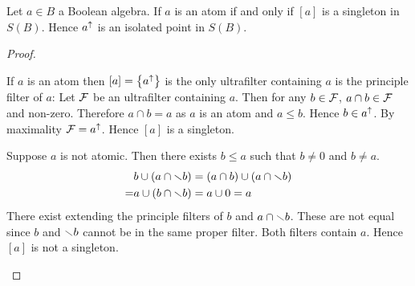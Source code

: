 \begin{prop}
    Let $a \in B$ a Boolean algebra.
    If $a$ is an atom if and only if $[a]$ is a singleton in $S(B)$.
    Hence $a^{\uparrow}$ is an isolated point in $S(B)$.
\end{prop}
\begin{proof}
    \begin{forward}
        If $a$ is an atom then $[a] = \left\{a^{\uparrow}\right\}$ is the only ultrafilter 
        containing $a$ is the principle filter of $a$:
        Let $\mathcal{F}$ be an ultrafilter containing $a$.
        Then for any $b \in \mathcal{F}$, 
        $a \cap b \in \mathcal{F}$ and non-zero.
        Therefore $a \cap b = a$ as $a$ is an atom and $a \leq b$.
        Hence $b \in a^{\uparrow}$.
        By maximality $\mathcal{F} = a^{\uparrow}$.
        Hence $[a]$ is a singleton.
    \end{forward}

    \begin{backward}
        Suppose $a$ is not atomic. 
        Then there exists $b \leq a$ such that $b \ne 0$ and $b \ne a$.
        \begin{align*}
            & b \cup (a \cap \smallsetminus b)
            = (a \cap b) \cup (a \cap \smallsetminus b)\\
            = & a \cup (b \cap \smallsetminus b) = a \cup 0 = a
        \end{align*}
        There exist  
        extending the principle filters of $b$ and 
        $a \cap \smallsetminus b$.
        These are not equal since $b$ and $\smallsetminus b$ cannot be in the same 
        proper filter.
        Both filters contain $a$. 
        Hence $[a]$ is not a singleton.
    \end{backward}
\end{proof}